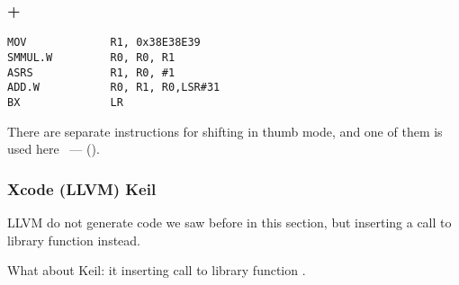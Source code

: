 \subsubsection{\OptimizingXcode + \ThumbTwoMode}

\begin{lstlisting}
MOV             R1, 0x38E38E39
SMMUL.W         R0, R0, R1
ASRS            R1, R0, #1
ADD.W           R0, R1, R0,LSR#31
BX              LR
\end{lstlisting}

{There are separate instructions for shifting in thumb mode}, 
{and one of them is used here} ~---  ().

\subsubsection{\NonOptimizing Xcode (LLVM)  Keil}

\NonOptimizing LLVM 
{do not generate code we saw before in this section, but inserting a call to library function 
 instead}.

{What about Keil: it inserting call to library function} .

